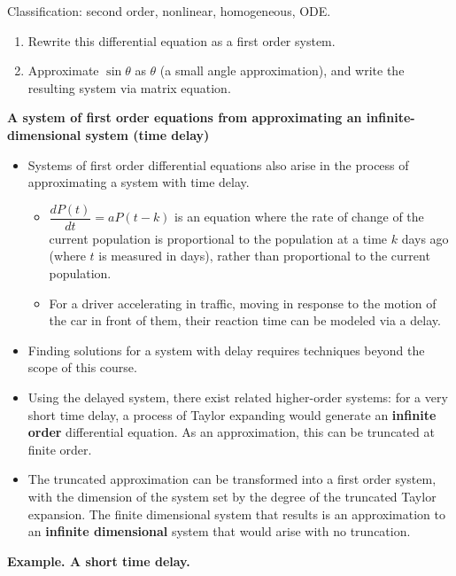 \documentclass[12pt,letterpaper,noanswers]{exam}
\begin{document}
Classification: second order, nonlinear, homogeneous, ODE.
\begin{enumerate}
    \item Rewrite this differential equation as a first order system. 
    \item  Approximate $\sin\theta$ as $\theta$ (a small angle approximation), and write the resulting system via  matrix equation.
\end{enumerate}

\vspace{1.5in}

\eject

 \noindent\textbf{A system of first order equations from approximating an infinite-dimensional system (time delay)}
    \begin{tcolorbox}
    \begin{itemize}
    \itemsep0em

    \item Systems of first order differential equations also arise in the process of approximating a system with time delay.  
    \begin{itemize}
    \itemsep0em
        \item $\dfrac{dP(t)}{dt} = aP(t-k)$ is an equation where the rate of change of the current population is proportional to the population at a time $k$ days ago (where $t$ is measured in days), rather than proportional to the current population.
        \item For a driver accelerating in traffic, moving in response to the motion of the car in front of them, their reaction time can be modeled via a delay.
    \end{itemize}
    \item Finding solutions for a system with delay requires techniques beyond the scope of this course.
    \item Using the delayed system, there exist related higher-order systems: for a very short time delay, a process of Taylor expanding would generate an \textbf{infinite order} differential equation.  As an approximation, this can be truncated at finite order.
    \item The truncated approximation can be transformed into a first order system, with the dimension of the system set by the degree of the truncated Taylor expansion.  The finite dimensional system that results is an approximation to an \textbf{infinite dimensional} system that would arise with no truncation.
\end{itemize}
\end{tcolorbox}
\noindent\textbf{Example. A short time delay.}
\end{document}
